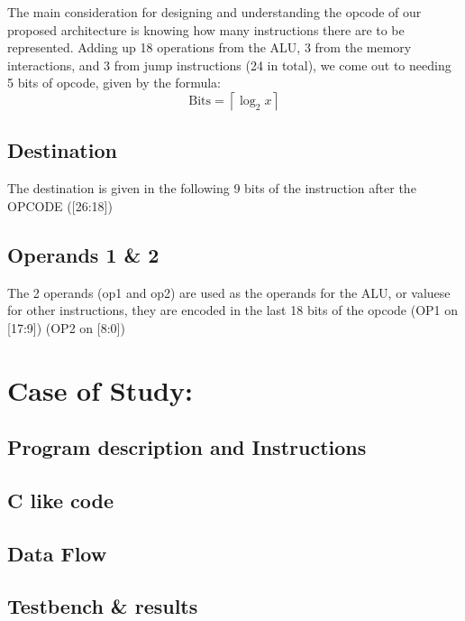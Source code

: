 \documentclass[9pt,a4paper,twoside]{tau}
\begin{document}
        The main consideration for designing and understanding the opcode of our proposed architecture is knowing how many instructions there are to be represented. Adding up 18 operations from the ALU, 3 from the memory interactions, and 3 from jump instructions (24 in total), we come out to needing 5 bits of opcode, given by the formula:
        \begin{equation}
            \text{Bits} = \left\lceil \log_{2}{x} \right\rceil
        \end{equation}

        
        \subsection{Destination}
        The destination is given in the following 9 bits of the instruction after the OPCODE ([26:18]) 




        \subsection{Operands 1 \& 2}
        The 2 operands (op1 and op2) are used as the operands for the ALU, or valuese for other instructions, they are encoded in the last 18 bits of the opcode (OP1 on [17:9]) (OP2 on [8:0])
        
    


\section{Case of Study:}
    \subsection{Program description and Instructions}
    \subsection{C like code}

    \subsection{Data Flow}

    \subsection{Testbench \& results}


     
\end{document}
